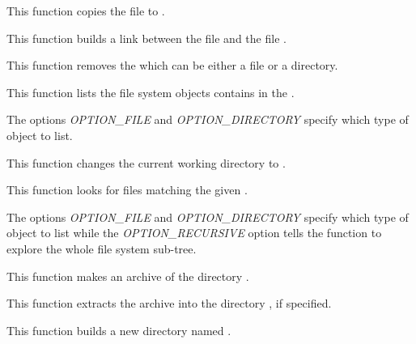          {
	   This function copies the file  to
	   .
	 }

         {
	   This function builds a link between the file 
	   and the file .
	 }

         {
	   This function removes the  which can be either
	   a file or a directory.
	 }

         {
	   This function lists the file system objects contains in the
	   .

	   \-

	   The options \textit{OPTION\_FILE} and \textit{OPTION\_DIRECTORY}
	   specify which type of object to list.
	 }

         {
	   This function changes the current working directory to
	   .
	 }

         {
	   This function looks for files matching the given .

	   \-

	   The options \textit{OPTION\_FILE} and \textit{OPTION\_DIRECTORY}
	   specify which type of object to list while the
	   \textit{OPTION\_RECURSIVE} option tells the function to explore
	   the whole file system sub-tree.
	 }

         {
	   This function makes an archive  of the
	   directory .
	 }

         {
	   This function extracts the archive  into the
	   directory , if specified.
	 }

         {
	   This function builds a new directory named .
	 }

